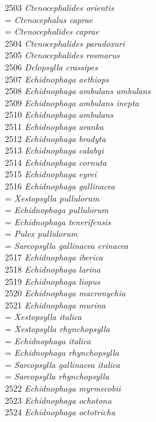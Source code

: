 \documentclass[
]{article}
\begin{document}
2503 \emph{Ctenocephalides orientis}\\
= \emph{Ctenocephalus caprae}\\
= \emph{Ctenocephalides caprae}\\
2504 \emph{Ctenocephalides paradoxuri}\\
2505 \emph{Ctenocephalides rosmarus}\\
2506 \emph{Delopsylla crassipes}\\
2507 \emph{Echidnophaga aethiops}\\
2508 \emph{Echidnophaga ambulans ambulans}\\
2509 \emph{Echidnophaga ambulans inepta}\\
2510 \emph{Echidnophaga ambulans}\\
2511 \emph{Echidnophaga aranka}\\
2512 \emph{Echidnophaga bradyta}\\
2513 \emph{Echidnophaga calabyi}\\
2514 \emph{Echidnophaga cornuta}\\
2515 \emph{Echidnophaga eyrei}\\
2516 \emph{Echidnophaga gallinacea}\\
= \emph{Xestopsylla pullulorum}\\
= \emph{Echidnophaga pullulorum}\\
= \emph{Echidnophaga tenerifensis}\\
= \emph{Pulex pullulorum}\\
= \emph{Sarcopsylla gallinacea erinacea}\\
2517 \emph{Echidnophaga iberica}\\
2518 \emph{Echidnophaga larina}\\
2519 \emph{Echidnophaga liopus}\\
2520 \emph{Echidnophaga macronychia}\\
2521 \emph{Echidnophaga murina}\\
= \emph{Xestopsylla italica}\\
= \emph{Xestopsylla rhynchopsylla}\\
= \emph{Echidnophaga italica}\\
= \emph{Echidnophaga rhynchopsylla}\\
= \emph{Sarcopsylla gallinacea italica}\\
= \emph{Sarcopsylla rhynchopsylla}\\
2522 \emph{Echidnophaga myrmecobii}\\
2523 \emph{Echidnophaga ochotona}\\
2524 \emph{Echidnophaga octotricha}\\
\end{document}
